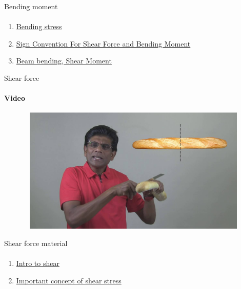 \documentclass[aspectratio=169]{beamer}
\begin{document}
\begin{frame}[t]{Bending moment}
    \framesubtitle{}
    \begin{enumerate}
        \item \href{https://www.youtube.com/watch?v=1tl8SQAjWLI&list=PLOBajja3EcWJx9MVpbBvLthzmZbq4Kwlm&index=79}{Bending stress}
        \item \href{https://youtu.be/GGpTG1FSaLM}{Sign Convention For Shear Force and Bending Moment}
        \item \href{https://youtu.be/fN5np4KzIBE}{Beam bending, Shear Moment}
    \end{enumerate}
    \end{frame}

\begin{frame}[t]{Shear force}
    \framesubtitle{Video}
    \vspace{-0.6cm}
    \begin{figure}[H]
        \href{https://www.youtube.com/watch?v=wGVIRsKFqiM}{
            \centering\includegraphics[height=6cm,width=1\textwidth,keepaspectratio]{shear_foce_video.jpg}}
        \label{fig:shear_foce_video.jpg}
    \end{figure}
\end{frame}

\begin{frame}[t]{Shear force material}
    \framesubtitle{}
    \begin{enumerate}
        \item \href{https://www.youtube.com/watch?v=FKu4tAaoZEM&list=PLOBajja3EcWJx9MVpbBvLthzmZbq4Kwlm&index=69&pp=iAQB}{Intro to shear}
        \item \href{https://www.youtube.com/watch?v=XlKzYy2d9BU&list=PL9RcWoqXmzaLlfmNg2Ku1SdZtvXnYrLbc&index=52&pp=iAQB}{Important concept of shear stress}
    \end{enumerate}
    \end{frame}
\end{document}
